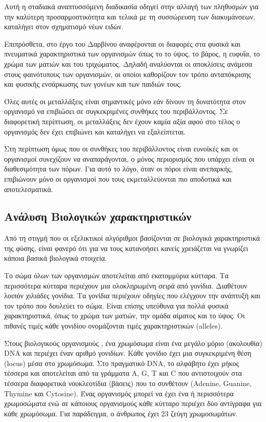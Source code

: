 Αυτή η σταδιακά αναπτυσσόμενη διαδικασία οδηγεί στην αλλαγή των πληθυσμών για την καλύτερη προσαρμοστικότητα και τελικά με τη συσσώρευση των διακυμάνσεων, καταλήγει στον σχηματισμό νέων ειδών.

Επιπρόσθετα, στο έργο του Δαρβίνου αναφέρονται οι διαφορές στα φυσικά και πνευματικά χαρακτηριστικά των οργανισμών \cite{Adamidis} όπως το το ύψος, το βάρος, η ευφυΐα, το χρώμα των ματιών και του τριχώματος. Δηλαδή αναλύονται οι αποκλίσεις ανάμεσα στους φαινότυπους των οργανισμών, οι οποίοι καθορίζουν τον τρόπο ανταπόκρισης και φυσικής ενσάρκωσης των γονέων και των παιδιών τους.

Όλες αυτές οι μεταλλάξεις είναι σημαντικές μόνο εάν δίνουν τη δυνατότητα στον οργανισμό να επιβιώσει σε συγκεκριμένες συνθήκες του περιβάλλοντος. Σε διαφορετική περίπτωση, οι μεταλλάξεις δεν έχουν καμία αξία αφού στο τέλος ο οργανισμός δεν έχει επιβιώνει και καταλήγει να εξαλείπτεται.

Στη περίπτωση όμως που οι συνθήκες του περιβάλλοντος είναι ευνοϊκές και οι οργανισμοί συνεχίζουν να αναπαράγονται, ο μόνος περιορισμός που υπάρχει είναι οι διαθεσιμότητα των πόρων. Για αυτό το λόγο, όταν οι πόροι είναι ανεπαρκής, επιβιώνουν μόνο οι οργανισμοί που τους εκμεταλλεύονται πιο αποδοτικά και αποτελεσματικά.

\subsection{Ανάλυση Βιολογικών χαρακτηριστικών}
Από τη στιγμή που οι εξελικτικοί αλγόριθμοι βασίζονται σε βιολογικά χαρακτηριστικά της φύσης, είναι φανερό ότι για να τους κατανοήσει κανείς χρειάζεται να γνωρίζει κάποια βασικά βιολογικά στοιχεία.

Το σώμα όλων των οργανισμών αποτελείται από εκατομμύρια κύτταρα. Τα περισσότερα κύτταρα περιέχουν μια ολοκληρωμένη σειρά από γονίδια. Διαθέτουν λοιπόν χιλιάδες γονίδια. Τα γονίδια περιέχουν οδηγίες που ελέγχουν την ανάπτυξή και τον τρόπο που δουλεύει το σώμα. Είναι επίσης υπεύθυνα για πολλά φυσικά χαρακτηριστικά, όπως το χρώμα των ματιών, την ομάδα αίματος και το ύψος. Οι πιθανές τιμές κάθε γονιδίου ονομάζονται τιμές χαρακτηριστικών (alleles).

Στους βιολογικούς οργανισμούς \cite{Vlaxavas}, ένα χρωμόσωμα είναι ένα μεγάλο μόριο (ακολουθία) DNA και περιέχει έναν αριθμό γονιδίων. Κάθε γονίδιο έχει μια συγκεκριμένη θέση (locus) μέσα στο χρωμόσωμα. Στο πραγματικό DNA, το αλφάβητο έχει μήκος τέσσερα και αποτελείται από τα γράμματα A, G, T και C που αντιστοιχούν στα τέσσερα διαφορετικά νουκλεοτίδια (βάσεις) που το συνθέτουν (Adenine, Guanine, Thymine και Cytosine). Ένας οργανισμός μπορεί να έχει ένα ή περισσότερα χρωμοσώματα ενώ σε κάποιους οργανισμούς κάθε κύτταρο περιέχει δύο αντίγραφα για κάθε χρωμόσωμα. Για παράδειγμα, ο άνθρωπος έχει 23 ζεύγη χρωμοσωμάτων.

